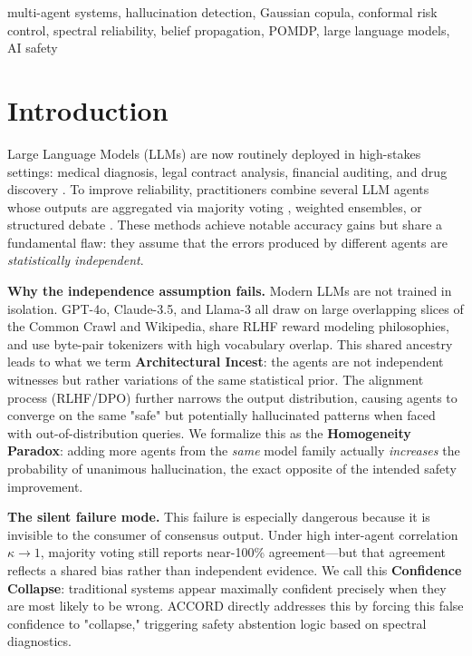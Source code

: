 \documentclass[conference]{IEEEtran}
\begin{document}
\begin{IEEEkeywords}
multi-agent systems, hallucination detection, Gaussian copula,
conformal risk control, spectral reliability, belief propagation,
POMDP, large language models, AI safety
\end{IEEEkeywords}

\section{Introduction}

Large Language Models (LLMs) are now routinely deployed in high-stakes settings: medical diagnosis, legal contract analysis, financial auditing, and drug discovery \cite{lin2021truthfulqa, thorne2018fever}. To improve reliability, practitioners combine several LLM agents whose outputs are aggregated via majority voting \cite{wang2022selfconsistency}, weighted ensembles, or structured debate \cite{du2023debate}. These methods achieve notable accuracy gains but share a fundamental flaw: they assume that the errors produced by different agents are \emph{statistically independent}.

\textbf{Why the independence assumption fails.}
Modern LLMs are not trained in isolation. GPT-4o, Claude-3.5, and Llama-3 all draw on large overlapping slices of the Common Crawl and Wikipedia, share RLHF reward modeling philosophies, and use byte-pair tokenizers with high vocabulary overlap. This shared ancestry leads to what we term \textbf{Architectural Incest}: the agents are not independent witnesses but rather variations of the same statistical prior. The alignment process (RLHF/DPO) further narrows the output distribution, causing agents to converge on the same "safe" but potentially hallucinated patterns when faced with out-of-distribution queries. We formalize this as the \textbf{Homogeneity Paradox}: adding more agents from the \emph{same} model family actually \emph{increases} the probability of unanimous hallucination, the exact opposite of the intended safety improvement.

\textbf{The silent failure mode.}
This failure is especially dangerous because it is invisible to the consumer of consensus output. Under high inter-agent correlation $\kappa \to 1$, majority voting still reports near-100\% agreement—but that agreement reflects a shared bias rather than independent evidence. We call this \textbf{Confidence Collapse}: traditional systems appear maximally confident precisely when they are most likely to be wrong. ACCORD directly addresses this by forcing this false confidence to "collapse," triggering safety abstention logic based on spectral diagnostics.
\end{document}
